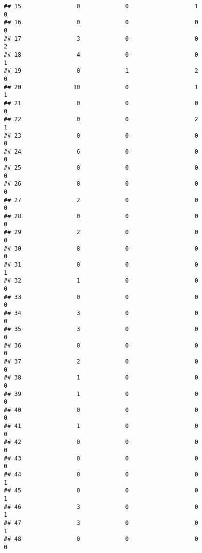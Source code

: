 \documentclass[
]{article}
\begin{document}
\begin{verbatim}
## 15                0             0                   1                   0
## 16                0             0                   0                   0
## 17                3             0                   0                   2
## 18                4             0                   0                   1
## 19                0             1                   2                   0
## 20               10             0                   1                   1
## 21                0             0                   0                   0
## 22                0             0                   2                   1
## 23                0             0                   0                   0
## 24                6             0                   0                   0
## 25                0             0                   0                   0
## 26                0             0                   0                   0
## 27                2             0                   0                   0
## 28                0             0                   0                   0
## 29                2             0                   0                   0
## 30                8             0                   0                   0
## 31                0             0                   0                   1
## 32                1             0                   0                   0
## 33                0             0                   0                   0
## 34                3             0                   0                   0
## 35                3             0                   0                   0
## 36                0             0                   0                   0
## 37                2             0                   0                   0
## 38                1             0                   0                   0
## 39                1             0                   0                   0
## 40                0             0                   0                   0
## 41                1             0                   0                   0
## 42                0             0                   0                   0
## 43                0             0                   0                   0
## 44                0             0                   0                   1
## 45                0             0                   0                   1
## 46                3             0                   0                   1
## 47                3             0                   0                   1
## 48                0             0                   0                   0

\end{verbatim}
\end{document}
